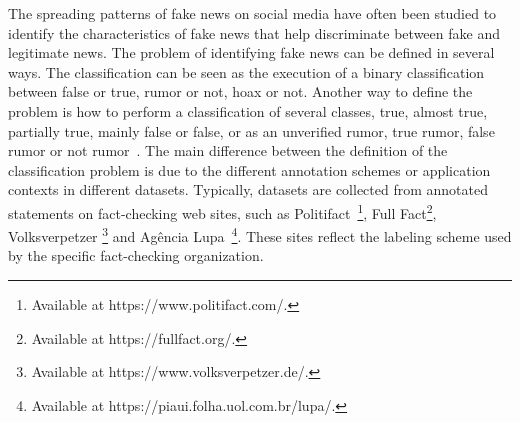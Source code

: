 \documentclass{ieeeaccess}
\begin{document}


The spreading patterns of fake news on social media have often been studied to identify the characteristics of fake news that help discriminate between fake and legitimate news. The problem of identifying fake news can be defined in several ways. The classification can be seen as the execution of a binary classification between false or true, rumor or not, hoax or not. Another way to define the problem is how to perform a classification of several classes, true, almost true, partially true, mainly false or false, or as an unverified rumor, true rumor, false rumor or not rumor~\cite{sharma2019fake}. The main difference between the definition of the classification problem is due to the different annotation schemes or application contexts in different datasets. Typically, datasets are collected from annotated statements on fact-checking web sites, such as Politifact~\footnote{Available at https://www.politifact.com/.}, Full Fact\footnote{Available at https://fullfact.org/.}, Volksverpetzer \footnote{Available at https://www.volksverpetzer.de/.} and Agência Lupa~\footnote{Available at https://piaui.folha.uol.com.br/lupa/.}. These sites reflect the labeling scheme used by the specific fact-checking organization.
\end{document}
